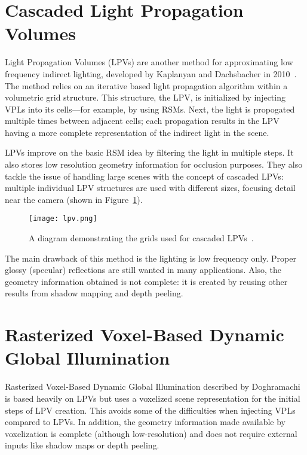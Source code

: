 \section{Cascaded Light Propagation Volumes}
Light Propagation Volumes (LPVs) are another method for approximating low frequency indirect lighting, developed by Kaplanyan and Dachsbacher in 2010~\cite{Kaplanyan:2010:CLP:1730804.1730821}. The method relies on an iterative based light propagation algorithm within a volumetric grid structure. This structure, the LPV, is initialized by injecting VPLs into its cells---for example, by using RSMs. Next, the light is propogated multiple times between adjacent cells; each propagation results in the LPV having a more complete representation of the indirect light in the scene.

LPVs improve on the basic RSM idea by filtering the light in multiple steps. It also stores low resolution geometry information for occlusion purposes. They also tackle the issue of handling large scenes with the concept of cascaded LPVs: multiple individual LPV structures are used with different sizes, focusing detail near the camera (shown in Figure~\ref{fig:lpv}).

\begin{figure}[h]
    \centering
    \texttt{[image: lpv.png]}
    \caption{A diagram demonstrating the grids used for cascaded LPVs~\cite{Kaplanyan:2010:CLP:1730804.1730821}.}
    \label{fig:lpv}
\end{figure}

The main drawback of this method is the lighting is low frequency only. Proper glossy (specular) reflections are still wanted in many applications. Also, the geometry information obtained is not complete: it is created by reusing other results from shadow mapping and depth peeling.

\section{Rasterized Voxel-Based Dynamic Global Illumination}
Rasterized Voxel-Based Dynamic Global Illumination described by Doghramachi~\cite{doghramachi2013rasterized} is based heavily on LPVs but uses a voxelized scene representation for the initial steps of LPV creation. This avoids some of the difficulties when injecting VPLs compared to LPVs. In addition, the geometry information made available by voxelization is complete (although low-resolution) and does not require external inputs like shadow maps or depth peeling.

